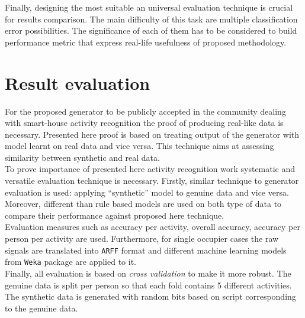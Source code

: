\documentclass[12pt, a4paper, pdflatex, leqno, twoside, openright]{report}
\begin{document}
Finally, designing the most suitable an universal evaluation technique is crucial for results comparison. The main difficulty of this task are multiple classification error possibilities. The significance of each of them has to be considered to build performance metric that express real-life usefulness of proposed methodology.

\section{Result evaluation}
For the proposed generator to be publicly accepted in the community dealing with smart-house activity recognition the proof of producing real-like data is necessary. Presented here proof is based on treating output of the generator with model learnt on real data and vice versa. This technique aims at assessing similarity between synthetic and real data.\\

To prove importance of presented here activity recognition work systematic and versatile evaluation technique is necessary. Firstly, similar technique to generator evaluation is used: applying ``synthetic'' model to genuine data and vice versa. Moreover, different than rule based models are used on both type of data to compare their performance against proposed here technique.\\
Evaluation measures such as accuracy per activity, overall accuracy, accuracy per person per activity are used. Furthermore, for single occupier cases the raw signals are translated into \texttt{ARFF} format and different machine learning models from \texttt{Weka} package are applied to it.\\
Finally, all evaluation is based on \emph{cross validation} to make it more robust. The genuine data is split per person so that each fold contains 5 different activities. The synthetic data is generated with random bits based on script corresponding to the genuine data.


\end{document}

